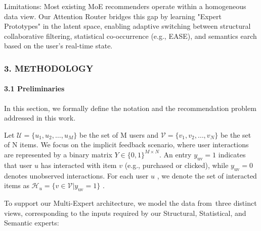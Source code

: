\documentclass[]{article}
\let\oldparagraph\paragraph
\renewcommand{\paragraph}[1]{\oldparagraph{#1}\mbox{}}
\begin{document}
Limitations: Most existing MoE recommenders operate within a homogeneous
data view. Our Attention Router bridges this gap by learning "Expert
Prototypes" in the latent space, enabling adaptive switching between
structural collaborative filtering, statistical co-occurrence (e.g.,
EASE), and semantics earch based on the user's real-time state.

\hypertarget{methodology}{%
\subsubsection{3. METHODOLOGY}\label{methodology}}

\hypertarget{preliminaries}{%
\paragraph{3.1 Preliminaries}\label{preliminaries}}

In this section, we formally define the notation and the recommendation
problem addressed in this work.

Let \(\mathcal{U} = \{ u_{1},u_{2},\ldots,u_{M}\}\) be the set of M
users and \(\mathcal{V} = \{ v_{1},v_{2},\ldots,v_{N}\}\) be the set of
N items. We focus on the implicit feedback scenario, where user
interactions are represented by a binary matrix
\(Y \in \{ 0,1\}^{M \times N}\). An entry \(y_{\text{uv}} = 1\)
indicates that user \(u\) has interacted with item \(v\) (e.g.,
purchased or clicked), while \(y_{\text{uv}} = 0\) denotes unobserved
interactions. For each user \(u\) , we denote the set of interacted
items as \(\mathcal{H}_{u} = \{ v \in \mathcal{V}|y_{\text{uv}} = 1\}\)
.

To support our Multi-Expert architecture, we model the data from~three
distinct views, corresponding to the inputs required by our Structural,
Statistical, and Semantic experts:
\end{document}
